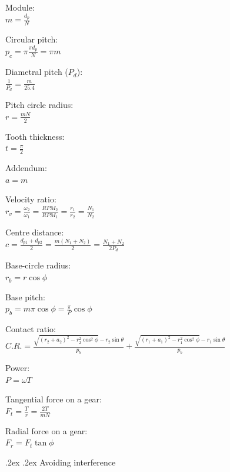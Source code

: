 \documentclass[10pt,landscape,a4paper]{article}
\makeatletter
\renewcommand{\subsection}{\@startsection{subsection}{1}{0mm}%
  {.2ex}%
  {.2ex}%
  {\sffamily\bfseries}}
\makeatother
\begin{document}
\begin{multicols*}{5}
  Module: \\
  \(m = \frac{d_p}{N}\)

  Circular pitch: \\
  \(p_c = \pi \frac{\pi d_p}{N} = \pi m\)

  Diametral pitch (\(P_d\)): \\
  \(\frac{1}{P_d} = \frac{m}{25.4}\)

  Pitch circle radius: \\
  \(r = \frac{mN}{2}\)

  Tooth thickness: \\
  \(t = \frac{\pi}{2}\)

  Addendum: \\
  \(a = m\)

  Velocity ratio: \\
  \(r_v = \frac{\omega_2}{\omega_1} = \frac{RPM_2}{RPM_1} = \frac{r_1}{r_2} = \frac{N_1}{N_2}\)

  Centre distance: \\
  \(c = \frac{d_{p1} + d_{p2}}{2} = \frac{m(N_1 + N_2)}{2} = \frac{N_1 + N_2}{2P_d}\)

  Base-circle radius: \\
  \(r_b = r \cos \phi\)

  Base pitch: \\
  \(p_b = m \pi \cos \phi = \frac{\pi}{P} \cos \phi\)

  Contact ratio: \\
  \(C.R. = \frac{\sqrt{(r_2 + a_2)^2 - r_2^2 \cos^2 \phi} - r_2 \sin \theta}{p_b} + \frac{\sqrt{(r_1 + a_1)^2 - r_1^2 \cos^2 \phi} - r_1 \sin \theta}{p_b}\)

  Power: \\
  \(P = \omega T\)

  Tangential force on a gear: \\
  \(F_t = \frac{T}{r} = \frac{2T}{mN}\)

  Radial force on a gear: \\
  \(F_r = F_t \tan \phi\)

  \subsection{Avoiding interference}


\end{multicols*}
\end{document}
